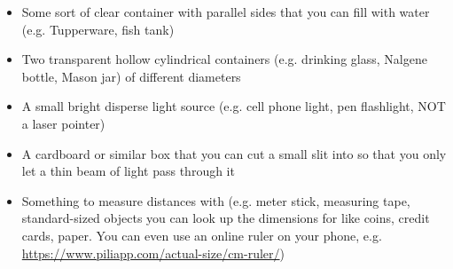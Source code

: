 \begin{itemize}
	\item Some sort of clear container with parallel sides that you can fill with water (e.g. Tupperware, fish tank)
	
	\item Two transparent hollow cylindrical containers (e.g. drinking glass, Nalgene bottle, Mason jar) of different diameters
	
	\item A small bright disperse light source (e.g. cell phone light, pen flashlight, NOT a laser pointer)
	
	\item A cardboard or similar box that you can cut a small slit into so that you only let a thin beam of light pass through it
	
	\item Something to measure distances with (e.g. meter stick, measuring tape, standard-sized objects you can look up the dimensions for like coins, credit cards, paper. You can even use an online ruler on your phone, e.g. \url{https://www.piliapp.com/actual-size/cm-ruler/})
\end{itemize}


